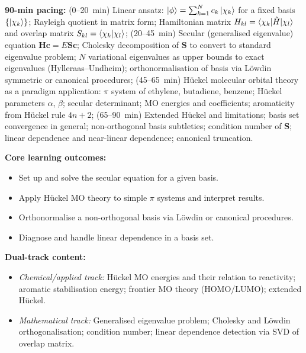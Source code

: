 \documentclass[11pt,a4paper]{article}
\begin{document}
\begin{tcolorbox}[modulebox, title={Module~II.1 / L02: The Linear Variational Method}]
\textbf{90-min pacing:} (0--20~min) Linear ansatz:
$\ket{\phi}=\sum_{k=1}^N c_k\ket{\chi_k}$ for a fixed basis $\{\ket{\chi_k}\}$;
Rayleigh quotient in matrix form;
Hamiltonian matrix $H_{kl}=\braket{\chi_k|\hat{H}|\chi_l}$ and
overlap matrix $S_{kl}=\braket{\chi_k|\chi_l}$;
(20--45~min) Secular (generalised eigenvalue) equation $\mathbf{H}\mathbf{c}=E\mathbf{S}\mathbf{c}$;
Cholesky decomposition of $\mathbf{S}$ to convert to standard eigenvalue problem;
$N$ variational eigenvalues as upper bounds to exact eigenvalues (Hylleraas--Undheim);
orthonormalisation of basis via L\"owdin symmetric or canonical procedures;
(45--65~min) H\"uckel molecular orbital theory as a paradigm application:
$\pi$ system of ethylene, butadiene, benzene;
H\"uckel parameters $\alpha$, $\beta$; secular determinant; MO energies and coefficients;
aromaticity from H\"uckel rule $4n+2$;
(65--90~min) Extended H\"uckel and limitations; basis set convergence in general;
non-orthogonal basis subtleties; condition number of $\mathbf{S}$; linear dependence and
near-linear dependence; canonical truncation.

\medskip\textbf{Core learning outcomes:}
\begin{itemize}[leftmargin=1.4em,topsep=2pt,itemsep=1pt]
  \item Set up and solve the secular equation for a given basis.
  \item Apply H\"uckel MO theory to simple $\pi$ systems and interpret results.
  \item Orthonormalise a non-orthogonal basis via L\"owdin or canonical procedures.
  \item Diagnose and handle linear dependence in a basis set.
\end{itemize}

\medskip\textbf{Dual-track content:}
\begin{itemize}[leftmargin=1.4em,topsep=2pt,itemsep=1pt]
  \item \textit{Chemical/applied track:} H\"uckel MO energies and their relation to
    reactivity; aromatic stabilisation energy; frontier MO theory (HOMO/LUMO); extended H\"uckel.
  \item \textit{Mathematical track:} Generalised eigenvalue problem; Cholesky and L\"owdin
    orthogonalisation; condition number; linear dependence detection via SVD of overlap matrix.
\end{itemize}


\end{tcolorbox}
\end{document}

